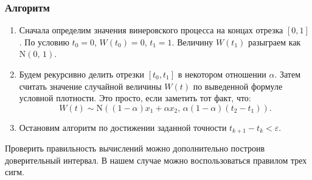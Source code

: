 \subsubsection{Алгоритм}
        \begin{enumerate}
                \item
Сначала определим значения винеровского процесса на концах отрезка $[0,1]$. По условию $t_0 = 0$, $W(t_0) = 0$, $t_1 = 1$. Величину $W(t_1)$ разыграем как $\mathrm{N}(0,\,1)$.
        \item
Будем рекурсивно делить отрезки $[t_0, t_1]$ в некотором отношении $\alpha$. Затем считать значение случайной величины $W(t)$ по выведенной формуле условной плотности. Это просто, если заметить тот факт, что:
$$
        W(t)
\sim
        \mathrm{N}
        (
          (1 - \alpha)
          x_1
          +
          \alpha
          x_2
        ,\,
          \alpha
          (1 - \alpha)
          (t_2 - t_1)
        ).
$$
        \item
Остановим алгоритм по достижении заданной точности $t_{k+1} - t_k < \varepsilon$.
\end{enumerate}
\begin{remark}
        Проверить правильность вычислений можно дополнительно построив доверительный интервал. В нашем случае можно воспользоваться правилом трех сигм.
\end{remark}


